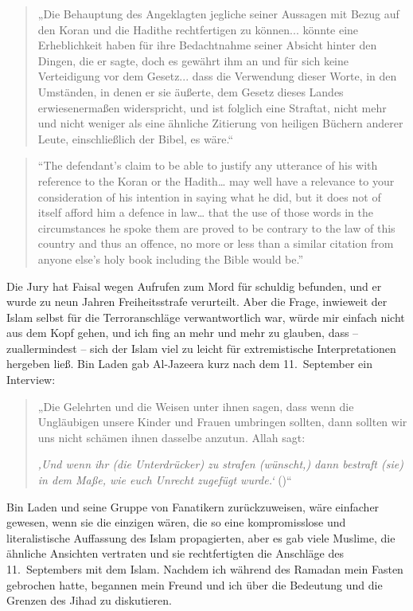 \documentclass[12pt]{memoir}
\begin{document}
\begin{quote}
„Die Behauptung des Angeklagten
jegliche seiner Aussagen mit Bezug auf den Koran
und die Hadithe rechtfertigen zu können...
könnte eine Erheblichkeit haben für ihre Bedachtnahme
seiner Absicht hinter den Dingen, die er sagte,
doch es gewährt ihm an und für sich keine Verteidigung vor dem Gesetz...
dass die Verwendung dieser Worte,
in den Umständen, in denen er sie äußerte,
dem Gesetz dieses Landes erwiesenermaßen widerspricht,
und ist folglich eine Straftat,
nicht mehr und nicht weniger als eine ähnliche Zitierung
von heiligen Büchern anderer Leute, einschließlich der Bibel, es wäre.“
\end{quote}

\begin{quote}
“The defendant’s claim to be able to justify any utterance
of his with reference to the Koran or the Hadith…
may well have a relevance to your consideration of his intention
in saying what he did, but it does not of itself afford him a defence in law…
that the use of those words in the circumstances he spoke them
are proved to be contrary to the law of this country and thus an offence,
no more or less than a similar citation from anyone else’s holy book
including the Bible would be.”
\end{quote}

Die Jury hat Faisal wegen Aufrufen zum Mord für schuldig befunden,
und er wurde zu neun Jahren Freiheitsstrafe verurteilt.
Aber die Frage, inwieweit der Islam selbst
für die Terroranschläge verwantwortlich war,
würde mir einfach nicht aus dem Kopf gehen,
und ich fing an mehr und mehr zu glauben,
dass – zuallermindest – sich der Islam viel zu leicht
für extremistische Interpretationen hergeben ließ.
Bin Laden gab Al-Jazeera kurz nach dem 11.\ September ein Interview:

\begin{quote}
„Die Gelehrten und die Weisen unter ihnen sagen,
dass wenn die Ungläubigen unsere Kinder und Frauen umbringen sollten,
dann sollten wir uns nicht schämen ihnen dasselbe anzutun.
Allah sagt:

\emph{‚Und wenn ihr (die Unterdrücker) zu strafen (wünscht,)
dann bestraft (sie) in dem Maße, wie euch Unrecht zugefügt wurde.‘}
()“
\end{quote}

Bin Laden und seine Gruppe von Fanatikern zurückzuweisen,
wäre einfacher gewesen, wenn sie die einzigen wären,
die so eine kompromisslose und literalistische Auffassung
des Islam propagierten,
aber es gab viele Muslime, die ähnliche Ansichten vertraten und
sie rechtfertigten die Anschläge des 11.\ Septembers mit dem Islam.
Nachdem ich während des Ramadan mein Fasten gebrochen hatte,
begannen mein Freund und ich über die Bedeutung
und die Grenzen des Jihad zu diskutieren.
\end{document}
